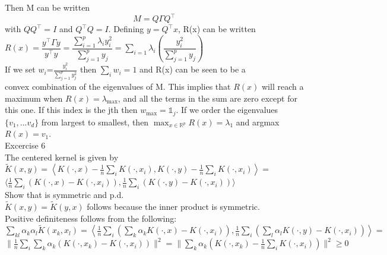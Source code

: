 \documentclass[18pt]{article}
\begin{document}
\begin{flushleft}
\vspace{.4cm}
Then M can be written
$$
M=Q  \Gamma Q^{\top}
$$
with $QQ^{\top}=I$ and $Q^{\top}Q=I$.
\vspace{.4cm}
Defining $y=Q^{\top}x$, R(x) can be written
\vspace{.4cm}
$R(x)=\dfrac{y^{\top}\Gamma y}{y^{\top}y}=\dfrac{\sum\limits_{i=1}^p \lambda_i y_i^2}{\sum\limits_{j=1}^p y_j}=\sum\limits_{i=1} \lambda_i \left(\dfrac{ y_i^2}{\sum\limits_{j=1}^p y_j}\right)$\\
\vspace{.4cm}
If we set $w_i$=$\frac{ y_i^2}{\sum\limits_{j=1}^p y_j^2}$ then $\sum_i w_i=1$ and R(x) can be seen to be a\\
convex combination of the eigenvalues of M. This implies that $R(x)$ will reach a maximum when $R(x)=\lambda_{\max}$, and all the terms in the sum are zero except for this one.
If this index is the jth then $w_{\max}=\mathbb{1}_j$. If we order the eigenvalues $\{v_1,...v_d\}$ from largest to smallest, then $\max_{x\in\mathbb{R}^p} R(x)=\lambda_1$ and argmax $R(x)=v_1$.\\
\vspace{.4cm}
Excercise 6\\
\vspace{.4cm}
The centered kernel is given by\\
\vspace{.4cm}
$\tilde{K}(x,y)=\left\langle K(\cdot,x)-\frac{1}{n}\sum_i K(\cdot,x_i), K(\cdot,y)-\frac{1}{n}\sum_i K(\cdot,x_i)\right\rangle=$\\
$\langle \frac{1}{n}\sum_i\left(K(\cdot,x)- K(\cdot,x_i)\right), \frac{1}{n}\sum_i\left(K(\cdot,y)- K(\cdot,x_i)\right)\rangle$\\
\vspace{.4cm}
Show that is symmetric and p.d.\\
\vspace{.4cm}
$\tilde{K}(x,y)=\tilde{K}(y,x)$ follows because the inner product is symmetric.\\
\vspace{.4cm}
Positive definiteness follows from the following:\\
\vspace{.4cm}
$\sum\limits_{kl} \alpha_k \alpha_l \tilde{K}(x_k,x_l)=\left\langle \frac{1}{n}\sum\limits_i\left(\sum\limits_k \alpha_k K(\cdot,x)- K(\cdot,x_i)\right), \frac{1}{n}\sum\limits_i\left(\sum\limits_l \alpha_l K(\cdot,y)- K(\cdot,x_i)\right)\right\rangle=$\\
$\parallel \frac{1}{n}\sum\limits_{i} \sum\limits_{k} \alpha_k \left(K(\cdot,x_k)-K(\cdot,x_i)\right) \parallel^2=\parallel \sum\limits_{k} \alpha_k \left( K(\cdot,x_k)-\frac{1}{n}\sum\limits_{i} K(\cdot,x_i)\right) \parallel^2 \geq0$\\

\end{flushleft}
\end{document}
